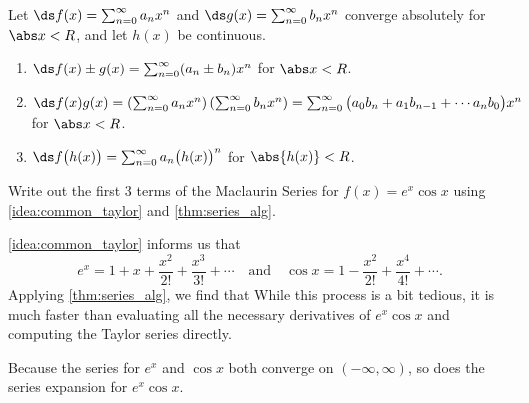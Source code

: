 {Let $\ds f(x) = \sum_{n=0}^\infty a_nx^n$ and $\ds g(x) = \sum_{n=0}^\infty b_nx^n$ converge absolutely for $\abs x<R$, and let $h(x)$ be continuous.
\begin{enumerate}
	\item $\ds f(x)\pm g(x) = \sum_{n=0}^\infty (a_n\pm b_n)x^n$ \quad for $\abs x<R$.
	\item	$\ds 	f(x)g(x) = \left(\sum_{n=0}^\infty a_nx^n\right)\left(\sum_{n=0}^\infty b_nx^n\right) = \sum_{n=0}^\infty\big(a_0b_n+a_1b_{n-1}+\dotsb a_nb_0\big)x^n
		$ for $\abs x<R$.
	
	\item		$\ds f\big(h(x)\big) = \sum_{n=0}^\infty a_n\big(h(x)\big)^n$ \quad for $\abs{h(x)}<R$.

\end{enumerate}}

{Write out the first 3 terms of the Maclaurin Series for $f(x) = e^x\cos x$ using \autoref{idea:common_taylor} and \autoref{thm:series_alg}.
}
{\autoref{idea:common_taylor} informs us that 
$$e^x = 1+x+\frac{x^2}{2!}+\frac{x^3}{3!}+\dotsb\quad \text{and}\quad \cos x = 1-\frac{x^2}{2!}+\frac{x^4}{4!}+\dotsb.$$
Applying \autoref{thm:series_alg}, we find that
While this process is a bit tedious, it is much faster than evaluating all the necessary derivatives of $e^x\cos x$ and computing the Taylor series directly.

Because the series for $e^x$ and $\cos x$ both converge on $(-\infty,\infty)$, so does the series expansion for $e^x\cos x$.}

